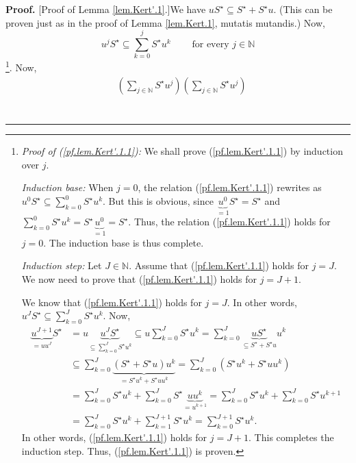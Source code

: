 \documentclass[numbers=enddot,12pt,final,onecolumn,notitlepage]{scrartcl}%
\theoremstyle{definition}
\newenvironment{proof}[1][Proof]{\noindent\textbf{#1.} }{\ \rule{0.5em}{0.5em}}
\let\sumnonlimits\sum
\renewcommand{\sum}{\sumnonlimits\limits}
\begin{document}
\begin{proof}
[Proof of Lemma \ref{lem.Kert'.1}.]We have $uS^{\star}\subseteq S^{\star
}+S^{\star}u$. (This can be proven just as in the proof of Lemma
\ref{lem.Kert.1}, mutatis mutandis.) Now,%
\begin{equation}
u^{j}S^{\star}\subseteq\sum_{k=0}^{j}S^{\star}u^{k}%
\ \ \ \ \ \ \ \ \ \ \text{for every }j\in\mathbb{N} \label{pf.lem.Kert'.1.1}%
\end{equation}
\footnote{\textit{Proof of (\ref{pf.lem.Kert'.1.1}):} We shall prove
(\ref{pf.lem.Kert'.1.1}) by induction over $j$.
\par
\textit{Induction base:} When $j=0$, the relation (\ref{pf.lem.Kert'.1.1})
rewrites as $u^{0}S^{\star}\subseteq\sum_{k=0}^{0}S^{\star}u^{k}$. But this is
obvious, since $\underbrace{u^{0}}_{=1}S^{\star}=S^{\star}$ and $\sum
_{k=0}^{0}S^{\star}u^{k}=S^{\star}\underbrace{u^{0}}_{=1}=S^{\star}$. Thus,
the relation (\ref{pf.lem.Kert'.1.1}) holds for $j=0$. The induction base is
thus complete.
\par
\textit{Induction step:} Let $J\in\mathbb{N}$. Assume that
(\ref{pf.lem.Kert'.1.1}) holds for $j=J$. We now need to prove that
(\ref{pf.lem.Kert'.1.1}) holds for $j=J+1$.
\par
We know that (\ref{pf.lem.Kert'.1.1}) holds for $j=J$. In other words,
$u^{J}S^{\star}\subseteq\sum_{k=0}^{J}S^{\star}u^{k}$. Now,%
\begin{align*}
\underbrace{u^{J+1}}_{=uu^{J}}S^{\star}  &  =u\underbrace{u^{J}S^{\star}%
}_{\subseteq\sum_{k=0}^{J}S^{\star}u^{k}}\subseteq u\sum_{k=0}^{J}S^{\star
}u^{k}=\sum_{k=0}^{J}\underbrace{uS^{\star}}_{\subseteq S^{\star}+S^{\star}%
u}u^{k}\\
&  \subseteq\sum_{k=0}^{J}\underbrace{\left(  S^{\star}+S^{\star}u\right)
u^{k}}_{=S^{\star}u^{k}+S^{\star}uu^{k}}=\sum_{k=0}^{J}\left(  S^{\star}%
u^{k}+S^{\star}uu^{k}\right) \\
&  =\sum_{k=0}^{J}S^{\star}u^{k}+\sum_{k=0}^{J}S^{\star}\underbrace{uu^{k}%
}_{=u^{k+1}}=\sum_{k=0}^{J}S^{\star}u^{k}+\sum_{k=0}^{J}S^{\star}u^{k+1}\\
&  =\sum_{k=0}^{J}S^{\star}u^{k}+\sum_{k=1}^{J+1}S^{\star}u^{k}=\sum
_{k=0}^{J+1}S^{\star}u^{k}.
\end{align*}
In other words, (\ref{pf.lem.Kert'.1.1}) holds for $j=J+1$. This completes the
induction step. Thus, (\ref{pf.lem.Kert'.1.1}) is proven.}. Now,%
\begin{align*}
&  \left(  \sum_{j\in\mathbb{N}}S^{\star}u^{j}\right)  \left(  \sum
_{j\in\mathbb{N}}S^{\star}u^{j}\right) \\

\end{align*}
\end{proof}
\end{document}
